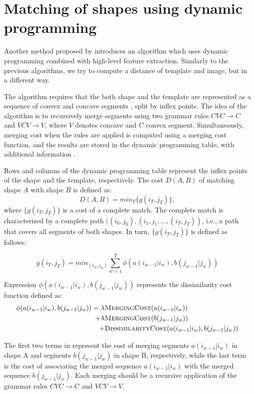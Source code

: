 \section{Matching of shapes using dynamic programming}

Another method proposed by \citet{convex} introduces an algorithm which uses dynamic programming combined with high-level feature extraction. Similarly to the previous algorithms, we  try to compute a distance of template and image, but in a different way.

The algorithm requires that the both shape and the template are represented as a sequence of convex and concave segments , split by inflex points. The idea of the algorithm is to recursively merge segments using two grammar rules $CVC \to C$ and $VCV \to V$, where $V$ denotes concave and $C$ convex segment. Simultaneously, merging cost when the rules are applied is computed using a merging cost function, and the results are stored in the dynamic programming table, with additional information .

Rows and columns of the dynamic programming table represent the inflex points of the shape and the template, respectively. The cost $D(A,B)$ of matching shape $A$ with shape $B$ is defined as:
\[ D(A,B) = min_{T} \{g(i_T,j_T)\}, \]
where $\{g(i_T,j_T)\}$ is a cost of a complete match. The complete match is characterized by a complete path $((i_{0},j_{0}),(i_{1},j_{1}, ..., (i_{T},j_{T}))$, i.e., a path that covers all segments of both shapes. In turn, $\{g(i_T,j_T)\}$ is defined as follows:

\[
g(i_{T},j_{T}) = min_(i_w,j_w) \sum_{w=1}^{T} \phi(a(i_{w-1}|i_{w}), b(j_{w-1}|j_{w}))
\]

Expression $\phi(a(i_{w-1}|i_{w}), b(j_{w-1}|j_{w}))$ represents the dissimilarity cost function defined as: 
\begin{align*}
\phi(a(i_{w-1}|i_{w}), b(j_{w-1}|j_{w}))  = \lambda & \textsc{MergingCost}(a(i_{w-1}|i_{w})) \\
+ \lambda & \textsc{MergingCost}(b(j_{w-1}|j_{w})) \\
+ &\textsc{DissimilarityCost}(a(i_{w-1}|i_{w}), b(j_{w-1}|j_{w}))
\end{align*}

The first two terms in represent the cost of merging segments $a(i_{w-1}|i_{w})$ in shape A and segments $b(j_{w-1}|j_{w})$ in shape B, respectively, while the last term is the cost of associating the merged sequence $a(i_{w-1}|i_{w})$ with the merged sequence $b(j_{w-1}|j_{w})$. Each merging should be a recursive application of the grammar rules  $CVC \to C$ and $VCV \to V$.

